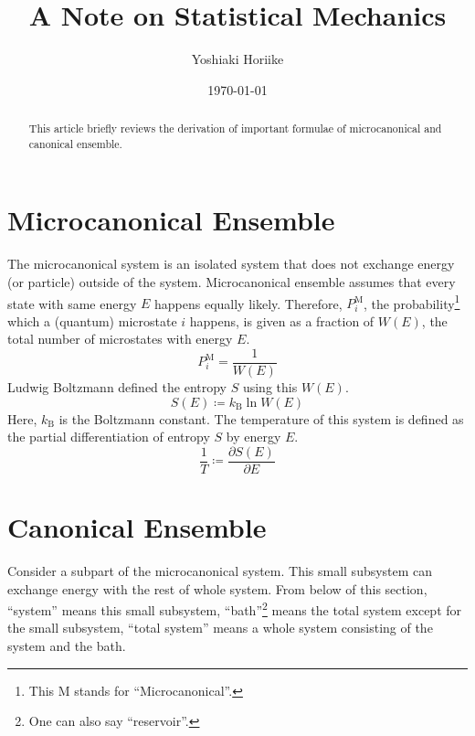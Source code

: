 \documentclass[a4paper,11pt]{article}
\begin{document}
\title{A Note on Statistical Mechanics}
\author{Yoshiaki Horiike}
\date{\today}
\maketitle
\begin{abstract}
  This article briefly reviews the derivation of important formulae of 
  microcanonical and canonical ensemble.
\end{abstract}

\section{Microcanonical Ensemble}
The microcanonical system is an isolated system that does not exchange 
energy (or particle) outside of the system.
Microcanonical ensemble assumes that every state with same
energy $E$ happens equally likely.
Therefore, $P^\mathrm{M}_i$, the probability\footnote
{
  This M stands for ``Microcanonical''.
}
which a (quantum) microstate $i$ happens, is given 
as a fraction of $W(E)$, the total number of microstates with energy $E$.
\begin{equation*}
  P^\mathrm{M}_i = \frac{1}{W(E)}
\end{equation*}
Ludwig Boltzmann defined the entropy $S$ using this $W(E)$.
\begin{equation*}
  S(E)
  \coloneqq
  k_\mathrm{B} \ln W(E)
\end{equation*}
Here, $k_\mathrm{B}$ is the Boltzmann constant.
The temperature of this system is defined as the partial differentiation 
of entropy $S$ by energy $E$.
\begin{equation*}
  \frac{1}{T}
  \coloneqq
  \frac{\partial S(E)}{\partial E}
\end{equation*}

\section{Canonical Ensemble}
Consider a subpart of the microcanonical system. 
This small subsystem can exchange energy with the rest of whole 
system. 
From below of this section, ``system'' means this small subsystem, 
``bath''\footnote{
  One can also say ``reservoir''.
} means the total system except for the small subsystem, 
``total system'' means a whole system consisting of the system and 
the bath.
\end{document}
